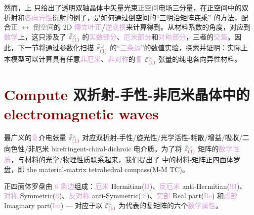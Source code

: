 然而，上  只给出了\textcolor{PineGreen}{透明双轴}晶体中\textcolor{PineGreen}{矢量光束}\textcolor{gray}{正空间}电场三分量，在正空间中的\textcolor{PineGreen}{双折射}和\textcolor{Plum}{各向异性}衍射的例子，是如何通过倒空间的“三明治矩阵连乘”  的方法，配合\textcolor{gray}{正} $\longleftrightarrow$ \textcolor{gray}{倒空间}的 2D \textcolor{Plum}{傅立叶正}/\textcolor{Plum}{逆变换}来计算得到。从材料系数的角度，对应到\textcolor{Plum}{数学}上，这只涉及了 $\bar{\bar{\varepsilon}}^{\;\! \mathcolor{gray}{\omega}}_{\textcolor{Maroon}{(1)}}$ 的\textcolor{Plum}{实数部分}、\textcolor{Plum}{厄米部分}和\textcolor{Plum}{对称部分}，三者的\textcolor{Plum}{交集}。因此，下一节将通过参数化扫描 $\bar{\bar{\varepsilon}}^{\;\! \mathcolor{gray}{\omega}}_{\textcolor{Maroon}{(1)}}$ 的“\textcolor{Plum}{三条边}”的数值实验，探索并证明：实际上本模型可以计算具有任意\textcolor{Plum}{非厄米}、\textcolor{Plum}{非对称}的\textcolor{Plum}{复} $\bar{\bar{\varepsilon}}^{\;\! \mathcolor{gray}{\omega}}_{\textcolor{Maroon}{(1)}}$ 张量的\textcolor{PineGreen}{纯电各向异性}材料。

\vspace*{-1.0em}

\section{\textcolor{Maroon}{Compute} 双折射-手性-非厄米晶体中的 \textcolor{Maroon}{electromagnetic waves}}\label{sec:birefringent-chiral-dichroic}

最广义的\textcolor{Plum}{复}介电张量 $\bar{\bar{\varepsilon}}^{\;\! \mathcolor{gray}{\omega}}_{\textcolor{Maroon}{(1)}}$ 对应\textcolor{NavyBlue}{双折射-手性/旋光性/光学活性-耗散/增益/吸收/二向色性/非厄米} birefringent-chiral-dichroic 电介质\cite{samlanChiralDynamicsExceptional2018}。为了将 $\bar{\bar{\varepsilon}}^{\;\! \mathcolor{gray}{\omega}}_{\textcolor{Maroon}{(1)}}$ 矩阵的\textcolor{Plum}{数学性质}，与材料的\textcolor{NavyBlue}{光学}/\textcolor{NavyBlue}{物理性质}联系起来，我们提出了  中的\textcolor{NavyBlue}{材料-矩阵正四面体罗盘}，即 the material-matrix tetrahedral compass(\textcolor{NavyBlue}{M-M TC})。

\textcolor{NavyBlue}{正四面体罗盘}由 \textcolor{Plum}{6 条边}组成：\textcolor{Plum}{厄米} Hermitian(\textcolor{Plum}{H})、\textcolor{Plum}{反厄米} anti-Hermitian(\textcolor{Plum}{$!$H})、\textcolor{Plum}{对称} Symmetric(\textcolor{Plum}{S})、\textcolor{Plum}{反对称} anti-Symmetric(\textcolor{Plum}{$!$S})、\textcolor{Plum}{实部} Real part(\textcolor{Plum}{Re}) 和\textcolor{Plum}{虚部} Imaginary part(\textcolor{Plum}{Im}) --- 对应于以 $\bar{\bar{\varepsilon}}^{\;\! \mathcolor{gray}{\omega}}_{\textcolor{Maroon}{(1)}}$ 为代表的复矩阵的六个\textcolor{Plum}{数学属性}。

